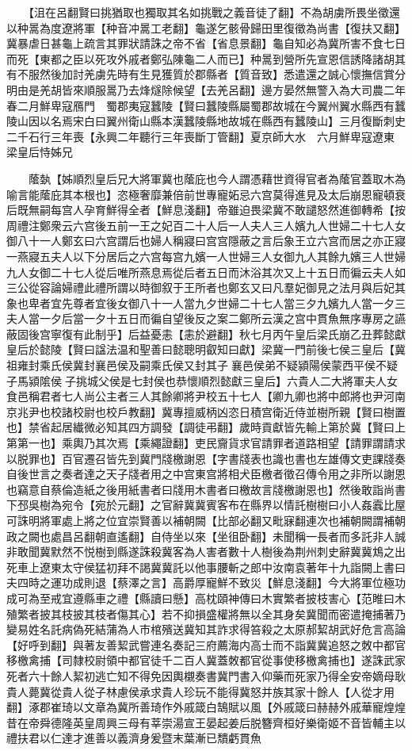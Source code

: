 　　【沮在呂翻賢曰挑猶取也獨取其名如挑戰之義音徒了翻】不為胡虜所畏坐徵還以种暠為度遼將軍【种音冲暠工老翻】龜遂乞骸骨歸田里復徵為尚書【復扶又翻】冀暴虐日甚龜上疏言其罪狀請誅之帝不省【省息景翻】龜自知必為冀所害不食七日而死【東都之臣以死攻外戚者鄭弘陳龜二人而已】种暠到營所先宣恩信誘降諸胡其有不服然後加討羌虜先時有生見獲質於郡縣者【質音致】悉遣還之誠心懷撫信賞分明由是羌胡皆來順服暠乃去烽燧除候望【去羌呂翻】邊方晏然無警入為大司農二年春二月鮮卑寇鴈門　蜀郡夷寇蠶陵【賢曰蠶陵縣屬蜀郡故城在今翼州翼水縣西有蠶陵山因以名焉宋白曰翼州衛山縣本漢蠶陵縣地故城在縣西有蠶陵山】三月復斷刺史二千石行三年喪【永興二年聽行三年喪斷丁管翻】夏京師大水　六月鮮卑寇遼東　梁皇后恃姊兄

　　䕃埶【姊順烈皇后兄大將軍冀也䕃庇也今人謂憑藉世資得官者為䕃官蓋取木為喻言能䕃庇其本根也】恣極奢靡兼倍前世專寵妬忌六宫莫得進見及太后崩恩寵頓衰后既無嗣每宫人孕育鮮得全者【鮮息淺翻】帝雖迫畏梁冀不敢譴怒然進御轉希【按周禮注鄭衆云六宫後五前一王之妃百二十人后一人夫人三人嬪九人世婦二十七人女御八十一人鄭玄曰六宫謂后也婦人稱寢曰宫宫隱蔽之言后象王立六宫而居之亦正寢一燕寢五夫人以下分居后之六宫每宫九嬪一人世婦三人女御九人其餘九嬪三人世婦九人女御二十七人從后唯所燕息焉從后者五日而沐浴其次又上十五日而徧云夫人如三公從容論婦禮此禮所謂以時御叙于王所者也鄭玄又曰凡羣妃御見之法月與后妃其象也卑者宜先尊者宜後女御八十一人當九夕世婦二十七人當三夕九嬪九人當一夕三夫人當一夕后當一夕十五日而徧自望後反之案二鄭所云漢之宫中貫魚無序專房之讌蔽固後宫寧復有此制乎】后益憂恚【恚於避翻】秋七月丙午皇后梁氏崩乙丑葬懿獻皇后於懿陵【賢曰諡法温和聖善曰懿聰明叡知曰獻】梁冀一門前後七侯三皇后【冀祖雍封乘氏侯冀封襄邑侯及嗣乘氏侯又封其子襄邑侯弟不疑潁陽侯蒙西平侯不疑子馬潁隂侯子挑城父侯是七封侯也恭懷順烈懿獻三皇后】六貴人二大將軍夫人女食邑稱君者七人尚公主者三人其餘卿將尹校五十七人【卿九卿也將中郎將也尹河南京兆尹也校諸校尉也校戶教翻】冀專擅威柄凶恣日積宫衛近侍並樹所親【賢曰樹置也】禁省起居纎微必知其四方調發【調徒弔翻】歲時貢獻皆先輸上第於冀【賢曰上第第一也】乘輿乃其次焉【乘繩證翻】吏民齎貨求官請罪者道路相望【請罪謂請求以脱罪也】百官遷召皆先到冀門牋檄謝恩【字書牋表也識也書也左雄傳文吏課牋奏自後世言之奏者達之天子牋者用之中宫東宫將相犬臣檄者徵召傳令用之非所以謝恩也竊意自蔡倫造紙之後用紙書者曰牋用木書者曰檄故言牋檄謝恩也】然後敢詣尚書下邳吳樹為宛令【宛於元翻】之官辭冀冀賓客布在縣界以情託樹樹曰小人姦蠧比屋可誅明將軍處上將之位宜崇賢善以補朝闕【比部必翻又毗寐翻連次也補朝闕謂補朝政之闕也處昌呂翻朝直遙翻】自侍坐以來【坐徂卧翻】未聞稱一長者而多託非人誠非敢聞冀默然不悦樹到縣遂誅殺冀客為人害者數十人樹後為荆州刺史辭冀冀鴆之出死車上遼東太守侯猛初拜不謁冀冀託以他事腰斬之郎中汝南袁著年十九詣闕上書曰夫四時之運功成則退【蔡澤之言】高爵厚寵鮮不致災【鮮息淺翻】今大將軍位極功成可為至戒宜遵縣車之禮【縣讀曰懸】高枕頤神傳曰木實繁者披枝害心【范睢曰木殖繁者披其枝披其枝者傷其心】若不抑損盛權將無以全其身矣冀聞而密遣掩捕著乃變易姓名託病偽死結蒲為人市棺殯送冀知其詐求得笞殺之太原郝絜胡武好危言高論【好呼到翻】與著友善絜武嘗連名奏記三府薦海内高士而不詣冀冀追怒之敇中都官移檄禽捕【司隸校尉領中都官徒千二百人冀蓋敇都官從事使移檄禽捕也】遂誅武家死者六十餘人絜初逃亡知不得免因輿櫬奏書冀門書入仰藥而死家乃得全安帝嫡母耿貴人薨冀從貴人從子林慮侯承求貴人珍玩不能得冀怒并族其家十餘人【人從才用翻】涿郡崔琦以文章為冀所善琦作外戚箴白鵠賦以風【外戚箴曰赫赫外戚華寵煌煌昔在帝舜德隆英皇周興三母有莘崇湯宣王晏起姜后脱簪齊桓好樂衛姬不音皆輔主以禮扶君以仁達才進善以義濟身爰暨末葉漸已穨虧貫魚